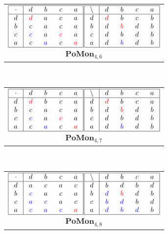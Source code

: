 \documentclass{amsart}
\newcommand{\g}{\textcolor{blue}}
\newcommand{\rd}{\textcolor{red}}
\newcommand{\W}[1]{\makebox[12pt]{$#1$}}%
\begin{document}
\ 
\begin{tabular}[b]{c}
$\begin{array}{|c|cccc|}\hline
\W{\cdot}&\W{d}&\W{b}&\W{c}&\W{a}\\\hline
d&\rd{d}&a&c&a\\
b&c&a&c&a\\
c&\g{c}&a&\rd{c}&a\\
a&c&\g{a}&c&\rd{a}\\
\hline
\end{array}$$\begin{array}{|c|cccc|}\hline
\W{\backslash}&\W{d}&\W{b}&\W{c}&\W{a}\\\hline
d&\rd{d}&b&c&b\\
b&d&\rd{b}&d&b\\
c&d&b&d&b\\
a&d&\g{b}&d&b\\
\hline
\end{array}$\\
$\mathbf{PoMon}_{4,6}$
\end{tabular}
\ 
\begin{tabular}[b]{c}
$\begin{array}{|c|cccc|}\hline
\W{\cdot}&\W{d}&\W{b}&\W{c}&\W{a}\\\hline
d&\rd{d}&b&c&a\\
b&c&a&c&a\\
c&\g{c}&a&\rd{c}&a\\
a&c&\g{a}&c&\rd{a}\\
\hline
\end{array}$$\begin{array}{|c|cccc|}\hline
\W{\backslash}&\W{d}&\W{b}&\W{c}&\W{a}\\\hline
d&\rd{d}&b&c&a\\
b&d&\rd{b}&d&b\\
c&d&b&d&b\\
a&d&\g{b}&d&b\\
\hline
\end{array}$\\
$\mathbf{PoMon}_{4,7}$
\end{tabular}
\ 
\begin{tabular}[b]{c}
$\begin{array}{|c|cccc|}\hline
\W{\cdot}&\W{d}&\W{b}&\W{c}&\W{a}\\\hline
d&a&c&a&c\\
b&\g{c}&a&c&a\\
c&\g{a}&\g{c}&a&c\\
a&\g{c}&\g{a}&\g{c}&\rd{a}\\
\hline
\end{array}$$\begin{array}{|c|cccc|}\hline
\W{\backslash}&\W{d}&\W{b}&\W{c}&\W{a}\\\hline
d&b&d&b&d\\
b&\g{d}&\rd{b}&d&b\\
c&\g{b}&\g{d}&b&d\\
a&\g{d}&\g{b}&\g{d}&b\\
\hline
\end{array}$\\
$\mathbf{PoMon}_{4,8}$
\end{tabular}
\end{document}
